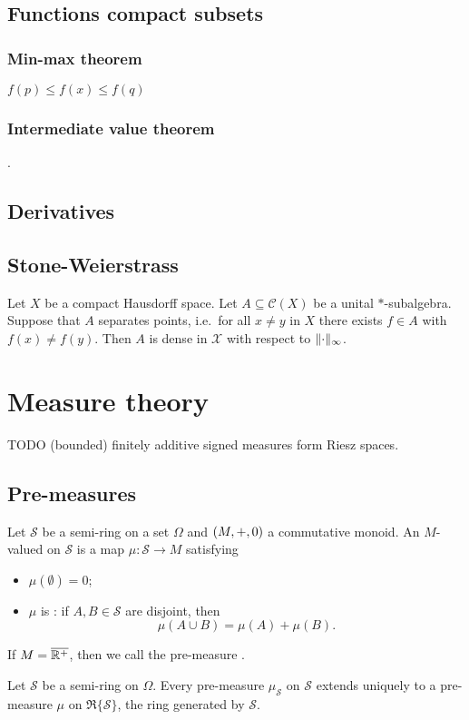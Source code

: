 \section{Functions compact subsets}
\subsection{Min-max theorem} $f(p) \leq f(x) \leq f(q)$

\subsection{Intermediate value theorem}.

\section{Derivatives}

\section{Stone-Weierstrass}
\begin{theorem} \label{StoneWeierstrass}
Let $X$ be a compact Hausdorff space. Let $A\subseteq \mathcal{C}(X)$ be a unital $*$-subalgebra. Suppose that $A$ separates points, i.e.\ for all $x\neq y$ in $X$ there exists $f\in A$ with $f(x) \neq f(y)$. Then $A$ is dense in $\mathcal{X}$ with respect to $\lVert\cdot\rVert_\infty$.
\end{theorem}



\chapter{Measure theory}
TODO (bounded) finitely additive signed measures form Riesz spaces.
\section{Pre-measures}
\begin{definition}
Let $\mathcal{S}$ be a semi-ring on a set $\Omega$ and $\left( M,+,0 \right)$ a commutative monoid. An $M$-valued  on $\mathcal{S}$ is a map $\mu: \mathcal{S} \to M$ satisfying
\begin{itemize}
\item $\mu(\emptyset) = 0$;
\item $\mu$ is : if $A,B \in \mathcal{S}$ are disjoint, then
\[ \mu(A\cup B) = \mu(A)+\mu(B). \]
\end{itemize}
If $M = \overline{\mathbb{R}^+}$, then we call the pre-measure .
\end{definition}
\begin{proposition}
Let $\mathcal{S}$ be a semi-ring on $\Omega$. Every pre-measure $\mu_\mathcal{S}$ on $\mathcal{S}$ extends uniquely to a pre-measure $\mu$ on $\mathfrak{R}\{\mathcal{S}\}$, the ring generated by $\mathcal{S}$.
\end{proposition}

